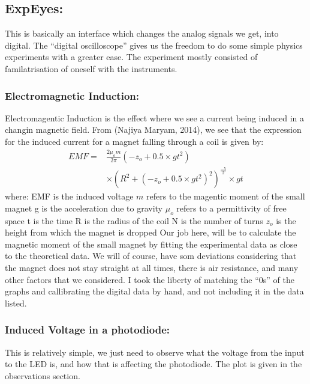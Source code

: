 \begin{Abstract:}
\begin{Abstract:}
\subsection{ExpEyes:}
	This is basically an interface which changes the analog signals we get, into digital. The ``digital oscilloscope'' gives us the freedom to do some simple physics experiments with a greater ease. The experiment mostly consisted of familatrisation of oneself with the instruments.
\subsubsection{Electromagnetic Induction:}
	Electromagentic Induction is the effect where we see a current being induced in a changin magnetic field. From (Najiya Maryam, 2014), we see that the expression for the induced current for a magnet falling through a coil is given by:
	\begin{align}
		EMF = &\frac{2\mu_o m}{2\pi}(-z_o+0.5\times gt^2) \\ \nonumber
		&\times (R^2+(-z_o+0.5\times gt^2)^2)^\frac{-5}{2}\times gt
	\end{align}
	where:
	\newline EMF is the induced voltage
	\newline $m$ refers to the magentic moment of the small magnet
	\newline g is the acceleration due to gravity
	\newline $\mu_o$ refers to a permittivity of free space
	\newline t is the time
	\newline R is the radius of the coil
	\newline N is the number of turns
	\newline $z_o$ is the height from which the magnet is dropped
	Our job here, will be to calculate the magnetic moment of the small magnet by fitting the experimental data as close to the theoretical data. We will of course, have som deviations considering that the magnet does not stay straight at all times, there is air resistance, and many other factors that we considered. I took the liberty of matching the ``0s'' of the graphs and callibrating the digital data by hand, and not including it in the data listed.
\subsubsection{Induced Voltage in a photodiode:}
	This is relatively simple, we just need to observe what the voltage from the input to the LED is, and how that is affecting the photodiode. The plot is given in the observations section.


\end{Abstract:}
\end{Abstract:}

